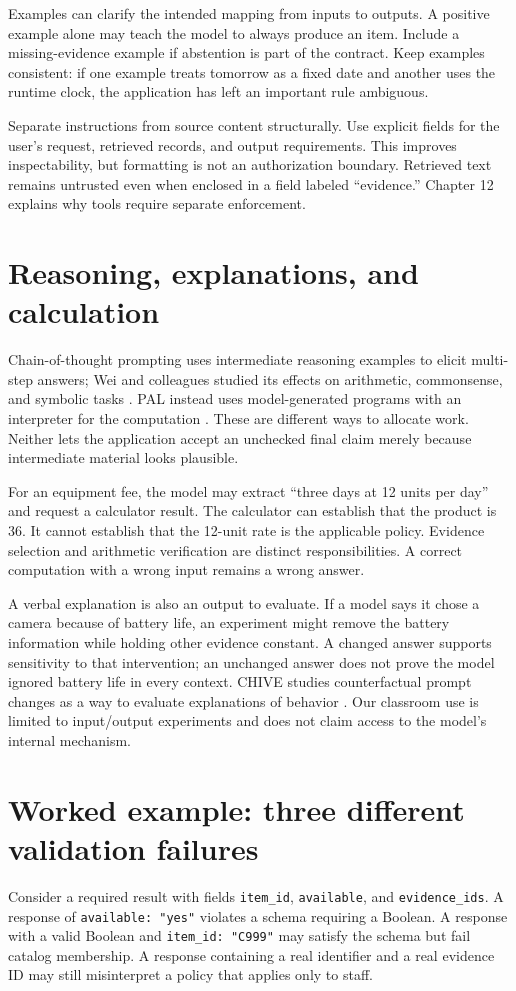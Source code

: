 Examples can clarify the intended mapping from inputs to outputs. A positive example alone may teach the model to always produce an item. Include a missing-evidence example if abstention is part of the contract. Keep examples consistent: if one example treats tomorrow as a fixed date and another uses the runtime clock, the application has left an important rule ambiguous.

Separate instructions from source content structurally. Use explicit fields for the user's request, retrieved records, and output requirements. This improves inspectability, but formatting is not an authorization boundary. Retrieved text remains untrusted even when enclosed in a field labeled “evidence.” Chapter 12 explains why tools require separate enforcement.

\section{Reasoning, explanations, and calculation}
Chain-of-thought prompting uses intermediate reasoning examples to elicit multi-step answers; Wei and colleagues studied its effects on arithmetic, commonsense, and symbolic tasks \cite{cot}. PAL instead uses model-generated programs with an interpreter for the computation \cite{pal}. These are different ways to allocate work. Neither lets the application accept an unchecked final claim merely because intermediate material looks plausible.

For an equipment fee, the model may extract “three days at 12 units per day” and request a calculator result. The calculator can establish that the product is 36. It cannot establish that the 12-unit rate is the applicable policy. Evidence selection and arithmetic verification are distinct responsibilities. A correct computation with a wrong input remains a wrong answer.

A verbal explanation is also an output to evaluate. If a model says it chose a camera because of battery life, an experiment might remove the battery information while holding other evidence constant. A changed answer supports sensitivity to that intervention; an unchanged answer does not prove the model ignored battery life in every context. CHIVE studies counterfactual prompt changes as a way to evaluate explanations of behavior \cite{chive}. Our classroom use is limited to input/output experiments and does not claim access to the model's internal mechanism.

\section{Worked example: three different validation failures}
Consider a required result with fields \texttt{item\_id}, \texttt{available}, and \texttt{evidence\_ids}. A response of \texttt{available: "yes"} violates a schema requiring a Boolean. A response with a valid Boolean and \texttt{item\_id: "C999"} may satisfy the schema but fail catalog membership. A response containing a real identifier and a real evidence ID may still misinterpret a policy that applies only to staff.

